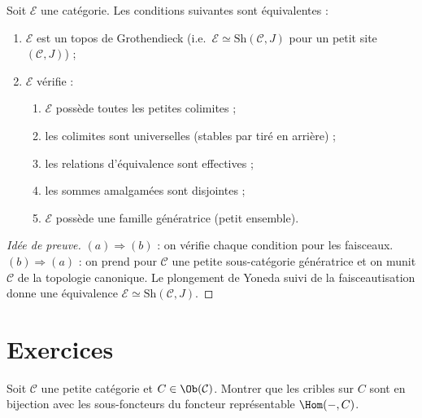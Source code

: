 \begin{theoreme}[Giraud]\label{thm:giraud}
Soit $\mathcal{E}$ une catégorie.  Les conditions suivantes sont
équivalentes :
\begin{enumerate}[label=(\alph*)]
\item $\mathcal{E}$ est un topos de Grothendieck (i.e.\ $\mathcal{E}
      \simeq \mathrm{Sh}(\mathcal{C}, J)$ pour un petit site
      $(\mathcal{C}, J)$) ;
\item $\mathcal{E}$ vérifie :
  \begin{enumerate}[label=(\roman*)]
  \item $\mathcal{E}$ possède toutes les petites colimites ;
  \item les colimites sont universelles (stables par tiré en arrière) ;
  \item les relations d'équivalence sont effectives ;
  \item les sommes amalgamées sont disjointes ;
  \item $\mathcal{E}$ possède une famille génératrice (petit ensemble).
  \end{enumerate}
\end{enumerate}
\end{theoreme}

\begin{proof}[Idée de preuve]
$(a) \Rightarrow (b)$ : on vérifie chaque condition pour les faisceaux.
$(b) \Rightarrow (a)$ : on prend pour $\mathcal{C}$ une petite
sous-catégorie génératrice et on munit $\mathcal{C}$ de la topologie
canonique.  Le plongement de Yoneda suivi de la faisceautisation
donne une équivalence $\mathcal{E} \simeq \mathrm{Sh}(\mathcal{C}, J)$.
\end{proof}


\section{Exercices}\label{sec:exo-topos}

\begin{exercice}\label{exo:crible}
Soit $\mathcal{C}$ une petite catégorie et $C \in \Ob(\mathcal{C})$.
Montrer que les cribles sur $C$ sont en bijection avec les
sous-foncteurs du foncteur représentable $\Hom(-, C)$.
\end{exercice}


